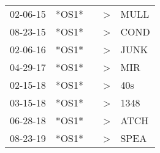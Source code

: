 \begin{supertabular}{lllll}
 02-06-15 &  *OS1* &   &  \textgreater &  MULL \\
 08-23-15 &  *OS1* &   &  \textgreater &  COND \\
 02-06-16 &  *OS1* &   &  \textgreater &  JUNK \\
 04-29-17 &  *OS1* &   &  \textgreater &   MIR \\
 02-15-18 &  *OS1* &   &  \textgreater &   40s \\
 03-15-18 &  *OS1* &   &  \textgreater &  1348 \\
 06-28-18 &  *OS1* &   &  \textgreater &  ATCH \\
 08-23-19 &  *OS1* &   &  \textgreater &  SPEA \\
\end{supertabular}
